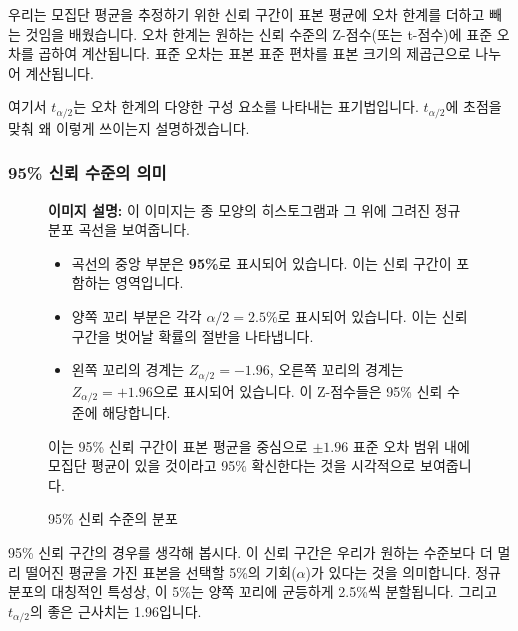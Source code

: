 \documentclass[11pt,a4paper]{article}
\begin{document}
우리는 모집단 평균을 추정하기 위한 신뢰 구간이 표본 평균에 오차 한계를 더하고 빼는 것임을 배웠습니다. 오차 한계는 원하는 신뢰 수준의 Z-점수(또는 t-점수)에 표준 오차를 곱하여 계산됩니다. 표준 오차는 표본 표준 편차를 표본 크기의 제곱근으로 나누어 계산됩니다.

\begin{equation*}
    [\bar{x} \pm t_{\alpha/2} \times \frac{s}{\sqrt{n}}]
\end{equation*}
여기서 $t_{\alpha/2}$는 오차 한계의 다양한 구성 요소를 나타내는 표기법입니다. $t_{\alpha/2}$에 초점을 맞춰 왜 이렇게 쓰이는지 설명하겠습니다.

\subsubsection*{95\% 신뢰 수준의 의미}

\begin{figure}[h!]
  \centering
  \begin{tcolorbox}[colback=gray!10, colframe=gray!50, title=\textbf{95\% 신뢰 수준의 시각화 (이미지 설명)}, sharp corners]
    \textbf{이미지 설명:} 이 이미지는 종 모양의 히스토그램과 그 위에 그려진 정규 분포 곡선을 보여줍니다.
    \begin{itemize}
        \item 곡선의 중앙 부분은 \textbf{95\%}로 표시되어 있습니다. 이는 신뢰 구간이 포함하는 영역입니다.
        \item 양쪽 꼬리 부분은 각각 \textbf{$\alpha/2 = 2.5\%$}로 표시되어 있습니다. 이는 신뢰 구간을 벗어날 확률의 절반을 나타냅니다.
        \item 왼쪽 꼬리의 경계는 \textbf{$Z_{\alpha/2} = -1.96$}, 오른쪽 꼬리의 경계는 \textbf{$Z_{\alpha/2} = +1.96$}으로 표시되어 있습니다. 이 Z-점수들은 95\% 신뢰 수준에 해당합니다.
    \end{itemize}
    이는 95\% 신뢰 구간이 표본 평균을 중심으로 $\pm 1.96$ 표준 오차 범위 내에 모집단 평균이 있을 것이라고 95\% 확신한다는 것을 시각적으로 보여줍니다.
  \end{tcolorbox}
  \caption{95\% 신뢰 수준의 분포}
  \label{fig:95_confidence_level_alpha}
\end{figure}

95\% 신뢰 구간의 경우를 생각해 봅시다. 이 신뢰 구간은 우리가 원하는 수준보다 더 멀리 떨어진 평균을 가진 표본을 선택할 5\%의 기회($\alpha$)가 있다는 것을 의미합니다. 정규 분포의 대칭적인 특성상, 이 5\%는 양쪽 꼬리에 균등하게 2.5\%씩 분할됩니다. 그리고 $t_{\alpha/2}$의 좋은 근사치는 1.96입니다.
\end{document}
